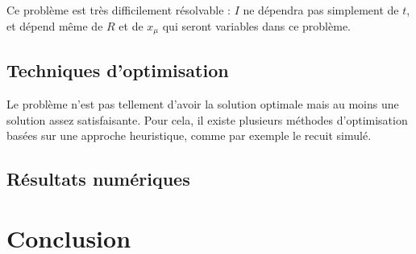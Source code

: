 \documentclass{article}
\begin{document}
Ce problème est très difficilement résolvable : $I$ ne dépendra pas simplement de $t$, et dépend même de $R$ et de $x_{\mu}$ qui seront variables dans ce problème.

\subsection{Techniques d'optimisation}
Le problème n'est pas tellement d'avoir la solution optimale mais au moins une solution assez satisfaisante. Pour cela, il existe plusieurs méthodes d'optimisation basées sur une approche heuristique, comme par exemple le recuit simulé. 

\subsection{Résultats numériques}

\section*{Conclusion}



\end{document}
